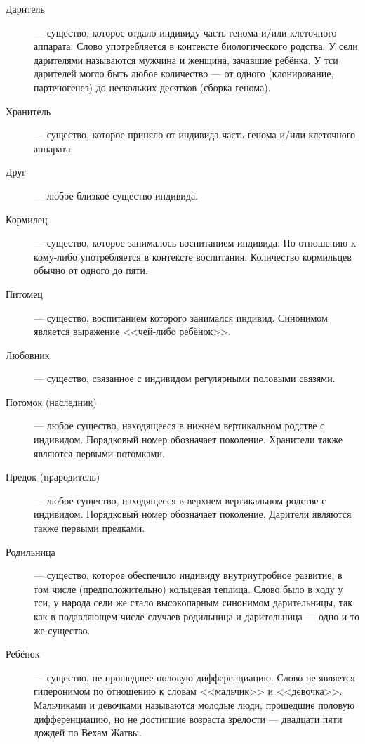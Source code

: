 \begin{description}
\item[Даритель] --- существо, которое отдало индивиду часть генома и/или клеточного аппарата.
Слово употребляется в контексте биологического родства.
У сели дарителями называются мужчина и женщина, зачавшие ребёнка.
У тси дарителей могло быть любое количество --- от одного (клонирование, партеногенез) до нескольких десятков (сборка генома).
\item[Хранитель] --- существо, которое приняло от индивида часть генома и/или клеточного аппарата.
\item[Друг] --- любое близкое существо индивида.
\item[Кормилец] --- существо, которое занималось воспитанием индивида.
По отношению к кому-либо употребляется в контексте воспитания.
Количество кормильцев обычно от одного до пяти.
\item[Питомец] --- существо, воспитанием которого занимался индивид.
Синонимом является выражение <<чей-либо ребёнок>>.
\item[Любовник] --- существо, связанное с индивидом регулярными половыми связями.
\item[Потомок (наследник)] --- любое существо, находящееся в нижнем вертикальном родстве с индивидом.
Порядковый номер обозначает поколение.
Хранители также являются первыми потомками.
\item[Предок (прародитель)] --- любое существо, находящееся в верхнем вертикальном родстве с индивидом.
Порядковый номер обозначает поколение.
Дарители являются также первыми предками.
\item[Родильница] --- существо, которое обеспечило индивиду внутриутробное развитие, в том числе (предположительно) кольцевая теплица.
Слово было в ходу у тси, у народа сели же стало высокопарным синонимом дарительницы, так как в подавляющем числе случаев родильница и дарительница --- одно и то же существо\FM.
\item[Ребёнок] --- существо, не прошедшее половую дифференциацию.
Слово не является гиперонимом по отношению к словам <<мальчик>> и <<девочка>>.
Мальчиками и девочками называются молодые люди, прошедшие половую дифференциацию, но не достигшие возраста зрелости --- двадцати пяти дождей по Вехам Жатвы.\\

\end{description}
